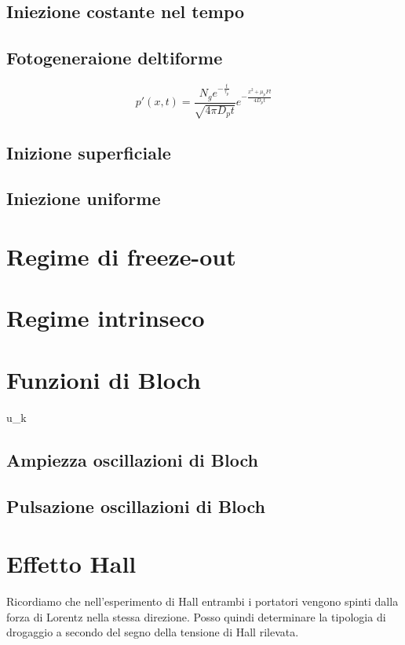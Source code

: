 \documentclass[10pt,a4paper]{report}
\begin{document}
	\section{Iniezione costante nel tempo}

	\section{Fotogeneraione deltiforme}
	\[
	p'(x,t)=\frac{N_g e^{-\frac {t}{\tau_p} } }{\sqrt{4\pi D_p t}}e^{-\frac{x^2+\mu_p F t}{4 D_p t}}
	\]
	\section{Inizione superficiale}

	\section{Iniezione uniforme}

\chapter{Regime di freeze-out}



\chapter{Regime intrinseco}

\chapter{Funzioni di Bloch}

u_k

	\section{Ampiezza oscillazioni di Bloch}

	\section{Pulsazione oscillazioni di Bloch}

\chapter{Effetto Hall}

Ricordiamo che nell'esperimento di Hall entrambi i portatori vengono spinti dalla forza di Lorentz nella stessa direzione.
Posso quindi determinare la tipologia di drogaggio a secondo del segno della tensione di Hall rilevata.
\end{document}
